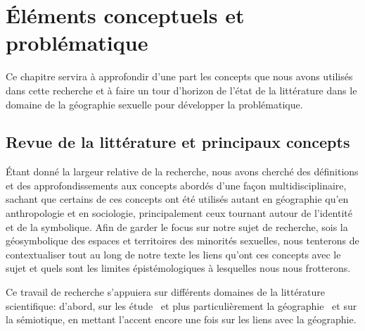 \chapter{Éléments conceptuels et problématique}
\label{cha:elements_conceptuels_et_problematique}


Ce chapitre servira à approfondir d'une part les concepts que nous avons utilisés dans cette recherche et à faire un tour d'horizon de l'état de la littérature dans le domaine de la géographie sexuelle pour développer la problématique.

\section{Revue de la littérature et principaux concepts}
\label{sec:revue_de_la_litterature_et_principaux_concepts} 

Étant donné la largeur relative de la recherche, nous avons cherché des définitions et des approfondissements aux concepts abordés d'une façon multidisciplinaire, sachant que certains de ces concepts ont été utilisés autant en géographie qu'en anthropologie et en sociologie, principalement ceux tournant autour de l'identité et de la symbolique. 
Afin de garder le focus sur notre sujet de recherche, sois la géosymbolique des espaces et territoires des minorités sexuelles, nous tenterons de contextualiser tout au long de notre texte les liens qu'ont ces concepts avec le sujet et quels sont les limites épistémologiques à lesquelles nous nous frotterons. 

Ce travail de recherche s’appuiera sur différents domaines de la littérature scientifique: d'abord, sur les étude \qus\ et plus particulièrement la géographie \qu\ et sur la sémiotique, en mettant l'accent encore une fois sur les liens avec la géographie. 

